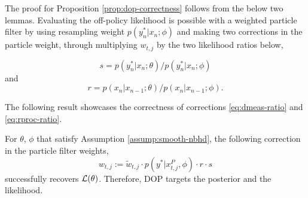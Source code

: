 \documentclass{article}
\begin{document}
The proof for Proposition \ref{prop:dop-correctness} follows from the below two lemmas. Evaluating the off-policy likelihood is possible with a weighted particle filter by using resampling weight $p(y^*_n|x_n;\phi)$ and making two corrections in the particle weight, through multiplying $w_{t,j}$ by the two likelihood ratios below,

\begin{equation}
    \label{eq:dmeas-ratio}
    s=p(y^*_n|x_n;\theta)/p(y^*_n|x_n;\phi)
\end{equation}
and
\begin{equation}
    \label{eq:rproc-ratio}
    r=p(x_n|x_{n-1};\theta)/p(x_n|x_{n-1};\phi).
\end{equation}


The following result showcases the correctness of corrections \ref{eq:dmeas-ratio} and \ref{eq:rproc-ratio}.

\begin{lem}
    For $\theta$, $\phi$ that satisfy Assumption \ref{assump:smooth-nbhd}, the following correction in the particle filter weights,
    \begin{equation}
        w_{t,j} := \tilde{w}_{t,j} \cdot p(y^*|x_{t,j}^P,\phi)\cdot r \cdot s
    \end{equation}
    successfully recovers $\mathcal{L}(\theta)$. Therefore, DOP targets the posterior and the likelihood.
\end{lem}
\end{document}
